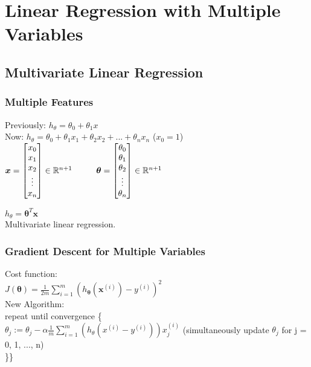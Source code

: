 \documentclass{article}
\newcommand\tab[1][1cm]{\hspace*{#1}}
\newcommand{\vect}[1]{\boldsymbol{#1}}
\begin{document}
\newpage

\section{Linear Regression with Multiple Variables}
\subsection{Multivariate Linear Regression}
\subsubsection{Multiple Features}
Previously: $h_\theta = \theta_0 + \theta_1 x$ \\
Now: $h_\theta = \theta_0 + \theta_1 x_1 + \theta_2 x_2 + ... + \theta_n x_n$ ($x_0 = 1$) \\

$\vect{x} = \begin{bmatrix}
x_0 \\ x_1 \\ x_2 \\ \vdots \\ x_n 
\end{bmatrix} \in \mathbb{R}^{n+1}
\tab
\vect{\theta} = \begin{bmatrix}
\theta_0 \\ \theta_1 \\ \theta_2 \\ \vdots \\ \theta_n 
\end{bmatrix} \in \mathbb{R}^{n+1} \\\\
\tab$

$h_\theta = \vect{\theta}^T \vect{x}$\\
Multivariate linear regression. 

\subsubsection{Gradient Descent for Multiple Variables}
Cost function:\\
$J(\vect{\theta}) = \frac{1}{2m} \sum_{i=1}^{m}(h_{\vect{\theta}}(\vect{x}^{(i)}) - y^{(i)})^2$\\

New Algorithm:\\
repeat until convergence \{\\
\tab $\theta_j := \theta_j - \alpha \frac{1}{m} \sum_{i=1}^{m}(h_\theta(x^{(i)} - y^{(i)})) x_{j}^{(i)}$ (simultaneously update $\theta_j$ for j = 0, 1, ..., n) \\
\}\}\\
\end{document}

